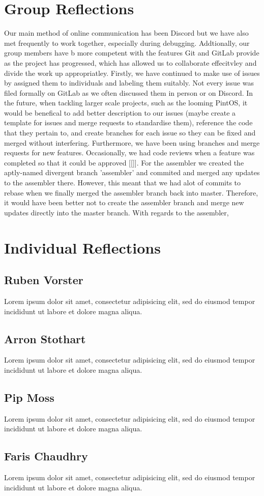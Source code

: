 \documentclass[11pt]{article}
\begin{document}
\pagebreak
\section{Group Reflections}
Our main method of online communication has been Discord but we have also met frequently to work together, especially during debugging. Addtionally, our group members have b more competent with the features Git and GitLab provide as the project has progressed, which has allowed us to collaborate effecitvley and divide the work up appropriatley. Firstly, we have continued to make use of issues by assigned them to individuals and labeling them suitably. Not every issue was filed formally on GitLab as we often discussed them in person or on Discord. In the future, when tackling larger scale projects, such as the looming PintOS, it would be benefical to add better description to our issues (maybe create a template for issues and merge requests to standardise them), reference the code that they pertain to, and create branches for each issue so they can be fixed and merged without interfering. Furthermore, we have been using branches and merge requests for new features. Occasionally, we had code reviews when a feature was completed so that it could be approved [[]]. For the assembler we created the aptly-named divergent branch 'assembler' and commited and merged any updates to the assembler there. However, this meant that we had alot of commits to rebase when we finally merged the assembler branch back into master. Therefore, it would have been better not to create the assembler branch and merge new updates directly into the master branch. 
With regards to the assembler, 

\section{Individual Reflections}
\subsection{Ruben Vorster}
Lorem ipsum dolor sit amet, consectetur adipisicing elit, sed do eiusmod tempor
incididunt ut labore et dolore magna aliqua.
\subsection{Arron Stothart}
Lorem ipsum dolor sit amet, consectetur adipisicing elit, sed do eiusmod tempor
incididunt ut labore et dolore magna aliqua.
\subsection{Pip Moss}
Lorem ipsum dolor sit amet, consectetur adipisicing elit, sed do eiusmod tempor
incididunt ut labore et dolore magna aliqua.
\subsection{Faris Chaudhry}
Lorem ipsum dolor sit amet, consectetur adipisicing elit, sed do eiusmod tempor
incididunt ut labore et dolore magna aliqua.
\end{document}
